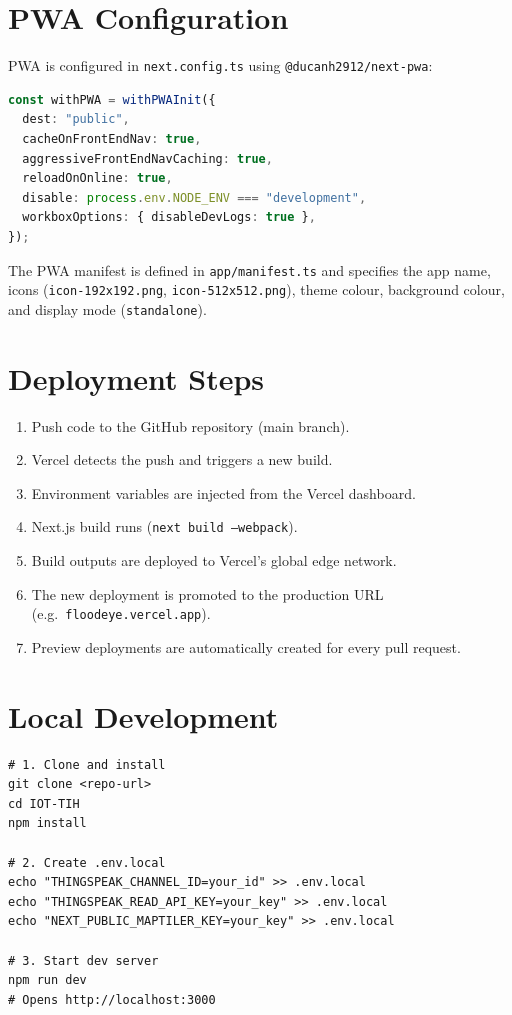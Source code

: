 \section{PWA Configuration}

PWA is configured in \texttt{next.\allowbreak{}config.\allowbreak{}ts} using \texttt{@ducanh2912/\allowbreak{}next-pwa}:

\begin{lstlisting}[language=TypeScript,caption={PWA configuration in next.config.ts}]
const withPWA = withPWAInit({
  dest: "public",
  cacheOnFrontEndNav: true,
  aggressiveFrontEndNavCaching: true,
  reloadOnOnline: true,
  disable: process.env.NODE_ENV === "development",
  workboxOptions: { disableDevLogs: true },
});
\end{lstlisting}

The PWA manifest is defined in \texttt{app/\allowbreak{}manifest.\allowbreak{}ts} and specifies the app name, icons (\texttt{icon-192x192.\allowbreak{}png}, \texttt{icon-512x512.\allowbreak{}png}), theme colour, background colour, and display mode (\texttt{standalone}).

\section{Deployment Steps}

\begin{enumerate}[leftmargin=1.5em]
  \item Push code to the GitHub repository (main branch).
  \item Vercel detects the push and triggers a new build.
  \item Environment variables are injected from the Vercel dashboard.
  \item Next.js build runs (\texttt{next build --webpack}).
  \item Build outputs are deployed to Vercel's global edge network.
  \item The new deployment is promoted to the production URL (e.g.\ \texttt{floodeye.\allowbreak{}vercel.\allowbreak{}app}).
  \item Preview deployments are automatically created for every pull request.
\end{enumerate}

\section{Local Development}

\begin{lstlisting}[language={},caption={Local development startup}]
# 1. Clone and install
git clone <repo-url>
cd IOT-TIH
npm install

# 2. Create .env.local
echo "THINGSPEAK_CHANNEL_ID=your_id" >> .env.local
echo "THINGSPEAK_READ_API_KEY=your_key" >> .env.local
echo "NEXT_PUBLIC_MAPTILER_KEY=your_key" >> .env.local

# 3. Start dev server
npm run dev
# Opens http://localhost:3000
\end{lstlisting}


